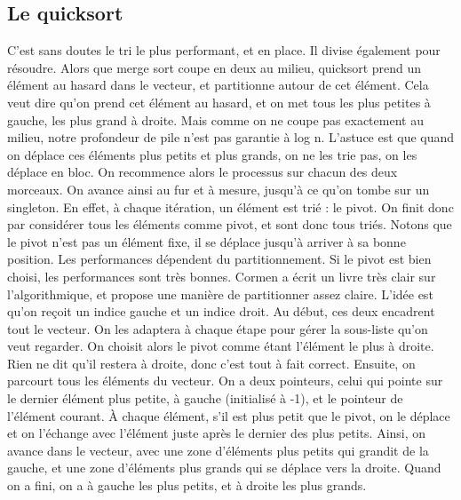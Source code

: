 \documentclass[10pt]{article}
\begin{document}
\subsection{Le quicksort} 
C'est sans doutes le tri le plus performant, et en place. Il divise également pour résoudre. Alors que merge sort coupe en deux au milieu, quicksort prend un élément au hasard dans le vecteur, et partitionne autour de cet élément. 
\newline \newline 
Cela veut dire qu'on prend cet élément au hasard, et on met tous les plus petites à gauche, les plus grand à droite. Mais comme on ne coupe pas exactement au milieu, notre profondeur de pile n'est pas garantie à log n. 
\newline \newline 
L'astuce est que quand on déplace ces éléments plus petits et plus grands, on ne les trie pas, on les déplace en bloc. On recommence alors le processus sur chacun des deux morceaux. On avance ainsi au fur et à mesure, jusqu'à ce qu'on tombe sur un singleton. En effet, à chaque itération, un élément est trié : le pivot. On finit donc par considérer tous les éléments comme pivot, et sont donc tous triés. Notons que le pivot n'est pas un élément fixe, il se déplace jusqu'à arriver à sa bonne position. 
\newline \newline 
Les performances dépendent du partitionnement. Si le pivot est bien choisi, les performances sont très bonnes. Cormen a écrit un livre très clair sur l'algorithmique, et propose une manière de partitionner assez claire. L'idée est qu'on reçoit un indice gauche et un indice droit. Au début, ces deux encadrent tout le vecteur. On les adaptera à chaque étape pour gérer la sous-liste qu'on veut regarder. On choisit alors le pivot comme étant l'élément le plus à droite. Rien ne dit qu'il restera à droite, donc c'est tout à fait correct. 
\newline \newline 
Ensuite, on parcourt tous les éléments du vecteur. On a deux pointeurs, celui qui pointe sur le dernier élément plus petite, à gauche (initialisé à -1), et le pointeur de l'élément courant. À chaque élément, s'il est plus petit que le pivot, on le déplace et on l'échange avec l'élément juste après le dernier des plus petits. Ainsi, on avance dans le vecteur, avec une zone d'éléments plus petits qui grandit de la gauche, et une zone d'éléments plus grands qui se déplace vers la droite. Quand on a fini, on a à gauche les plus petits, et à droite les plus grands. 
\end{document}
